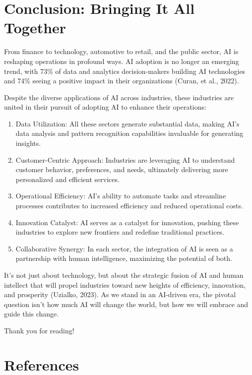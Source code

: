 \documentclass[
]{article}
\providecommand{\tightlist}{%
  \setlength{\itemsep}{0pt}\setlength{\parskip}{0pt}}
\begin{document}
\hypertarget{conclusion-bringing-it-all-together}{%
\section{Conclusion: Bringing It All Together}\label{conclusion-bringing-it-all-together}}

From finance to technology, automotive to retail, and the public sector, AI is reshaping operations in profound ways. AI adoption is no longer an emerging trend, with 73\% of data and analytics decision-makers building AI technologies and 74\% seeing a positive impact in their organizations (Curan, et al., 2022).

Despite the diverse applications of AI across industries, these industries are united in their pursuit of adopting AI to enhance their operations:

\begin{enumerate}
\def\labelenumi{\arabic{enumi}.}
\tightlist
\item
  Data Utilization: All these sectors generate substantial data, making AI's data analysis and pattern recognition capabilities invaluable for generating insights.
\item
  Customer-Centric Approach: Industries are leveraging AI to understand customer behavior, preferences, and needs, ultimately delivering more personalized and efficient services.
\item
  Operational Efficiency: AI's ability to automate tasks and streamline processes contributes to increased efficiency and reduced operational costs.
\item
  Innovation Catalyst: AI serves as a catalyst for innovation, pushing these industries to explore new frontiers and redefine traditional practices.
\item
  Collaborative Synergy: In each sector, the integration of AI is seen as a partnership with human intelligence, maximizing the potential of both.
\end{enumerate}

It's not just about technology, but about the strategic fusion of AI and human intellect that will propel industries toward new heights of efficiency, innovation, and prosperity (Uzialko, 2023). As we stand in an AI-driven era, the pivotal question isn't how much AI will change the world, but how we will embrace and guide this change.

Thank you for reading!

\hypertarget{references}{%
\section{References}\label{references}}
\end{document}
